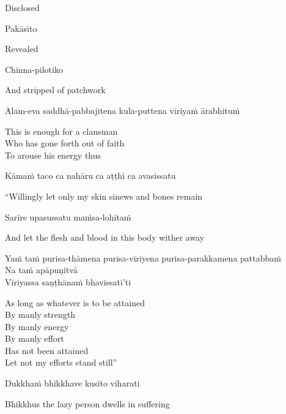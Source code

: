 \begin{cprenglish}
Disclosed
\end{cprenglish}

Pakāsito

\begin{cprenglish}
Revealed
\end{cprenglish}

Chinna-pilotiko

\begin{cprenglish}
And stripped of patchwork
\end{cprenglish}

Alam-eva saddhā-pabbajitena kula-puttena vīriyaṁ ārabhituṁ

\begin{cprenglish}
This is enough for a clansman\\
Who has gone forth out of faith\\
To arouse his energy thus
\end{cprenglish}

Kāmaṁ taco ca nahāru ca aṭṭhi ca avasissatu

\begin{cprenglish}
“Willingly let only my skin  sinews  and bones remain
\end{cprenglish}

Sarīre upasussatu maṁsa-lohitaṁ

\begin{cprenglish}
And let the flesh and blood in this body wither away
\end{cprenglish}

Yaṁ taṁ purisa-thāmena purisa-vīriyena purisa-parakkamena pattabbaṁ\\
Na taṁ apāpuṇitvā\\
Vīriyassa saṇṭhānaṁ bhavissatī’ti

\begin{cprenglish}
As long as whatever is to be attained\\
By manly strength\\
By manly energy\\
By manly effort\\
Has not been attained\\
Let not my efforts stand still”
\end{cprenglish}

Dukkhaṁ bhikkhave kusīto viharati

\begin{cprenglish}
Bhikkhus the lazy person dwells in suffering
\end{cprenglish}

